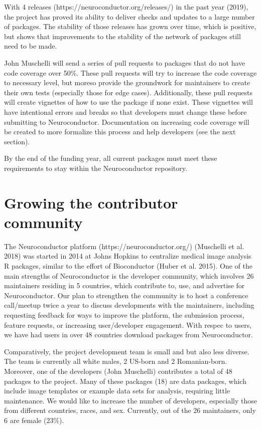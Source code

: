 \documentclass[]{elsarticle} %
\begin{document}
With 4 releases (https://neuroconductor.org/releases/) in the past year (2019), the project has proved its ability to deliver checks and updates to a large number of packages. The stability of those releases has grown over time, which is positive, but shows that improvements to the stability of the network of packages still need to be made.

John Muschelli will send a series of pull requests to packages that do not have code coverage over 50\%. These pull requests will try to increase the code coverage to necessary level, but moreso provide the groundwork for maintainers to create their own tests (especially those for edge cases). Additionally, these pull requests will create vignettes of how to use the package if none exist. These vignettes will have intentional errors and breaks so that developers must change these before submitting to Neuroconductor. Documentation on increasing code coverage will be created to more formalize this process and help developers (see the next section).

By the end of the funding year, all current packages must meet these requirements to stay within the Neuroconductor repository.

\hypertarget{growing-the-contributor-community}{%
\section{Growing the contributor community}\label{growing-the-contributor-community}}

The Neuroconductor platform (https://neuroconductor.org/) (Muschelli et al. 2018) was started in 2014 at Johns Hopkins to centralize medical image analysis R packages, similar to the effort of Bioconductor (Huber et al. 2015). One of the main strengths of Neuroconductor is the developer community, which involves 26 maintainers residing in 5 countries, which contribute to, use, and advertise for Neuroconductor. Our plan to strengthen the community is to host a conference call/meetup twice a year to discuss developments with the maintainers, including requesting feedback for ways to improve the platform, the submission process, feature requests, or increasing user/developer engagement. With respec to users, we have had users in over 48 countries download packages from Neuroconductor.

Comparatively, the project development team is small and but also less diverse. The team is currently all white males, 2 US-born and 2 Romanian-born. Moreover, one of the developers (John Muschelli) contributes a total of 48 packages to the project. Many of these packages (18) are data packages, which include image templates or example data sets for analysis, requiring little maintenance. We would like to increase the number of developers, especially those from different countries, races, and sex. Currently, out of the 26 maintainers, only 6 are female (23\%).
\end{document}
